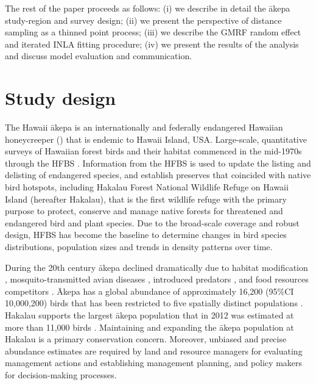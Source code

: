 \documentclass[preprint,12pt]{elsarticle}
\newcommand{\akepa}{\textquotesingle\={a}kepa}  %
\newcommand{\Akepa}{\textquotesingle\={A}kepa}  %
\newcommand{\hawaii}{Hawai\textquotesingle i}   %
\begin{document}
The rest of the paper proceeds as follows:  (i) we describe in detail the \akepa{} study-region and survey design; (ii) we present the perspective of distance sampling as a thinned point process; (iii) we describe the GMRF random effect and iterated INLA fitting procedure; (iv) we present the results of the analysis and discuss model evaluation and communication.


\section{Study design}

The \hawaii{} \akepa{} is an internationally and federally endangered Hawaiian honeycreeper (\citealp{usfws_akepa_1970, birdlife_akepa_2016}) that is endemic to \hawaii{} Island, USA.  Large-scale, quantitative surveys of Hawaiian forest birds and their habitat commenced in the mid-1970s through the HFBS \citep{scott_HFBS_1986}. Information from the HFBS is used to update the listing and delisting of endangered species, and establish preserves that coincided with native bird hotspots, including Hakalau Forest National Wildlife Refuge on \hawaii{} Island (hereafter Hakalau), that is the first wildlife refuge with the primary purpose to protect, conserve and manage native forests for threatened and endangered bird and plant species. Due to the broad-scale coverage and robust design, HFBS has become the baseline to determine changes in bird species distributions, population sizes and trends in density patterns over time.

During the 20th century \akepa{} declined dramatically due to habitat modification \citep{scott_HFBS_1986, pratt_avifaunal_1994},  mosquito-transmitted avian diseases \citep{pratt_avifaunal_1994, atkinson_wildlife_1995}, introduced predators \citep{lepson_akepa_1997}, and food resources competitors \citep{lepson_akepa_1997}. \Akepa{} has a global abundance of approximately 16,200 (95\%CI 10,000,200) birds that has been restricted to five spatially distinct populations \citep{judge_akepa_2018}. Hakalau supports the largest \akepa{} population that in 2012 was estimated at more than 11,000 birds \citep{camp_statespace_2016}. Maintaining and expanding the \akepa{} population at Hakalau is a primary conservation concern. Moreover, unbiased and precise abundance estimates are required by land and resource managers for evaluating management actions and establishing management planning, and policy makers for decision-making processes.
\end{document}

